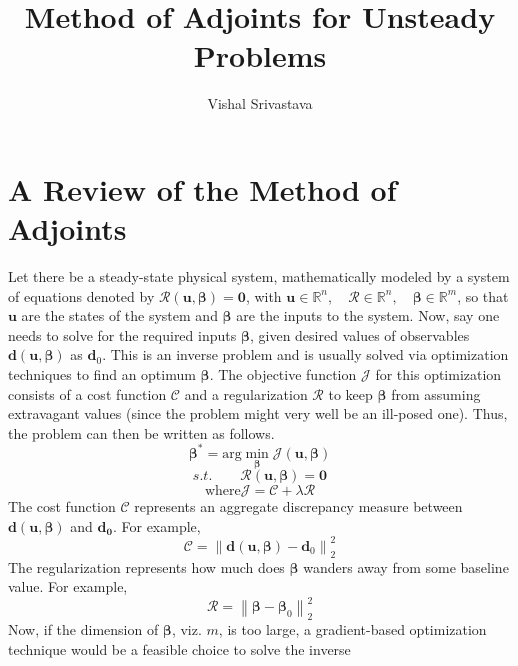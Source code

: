 \documentclass{article}
\title{Method of Adjoints for Unsteady Problems}
\author{Vishal Srivastava}
\date{}
\begin{document}
\maketitle

%
\section{A Review of the Method of Adjoints}
    Let there be a steady-state physical system, mathematically modeled by a system of equations denoted by $\boldsymbol{\mathcal{R}}(\boldsymbol{u}, 
    \boldsymbol{\beta})=\boldsymbol{0}$, with $\boldsymbol{u}\in\mathbb{R}^n,\quad \boldsymbol{\mathcal{R}}\in\mathbb{R}^n,\quad \boldsymbol{\beta}\in\mathbb{R}^m$, 
    so that $\boldsymbol{u}$ are the states of the system and $\boldsymbol{\beta}$ are the inputs to the system. Now, say one needs to solve for the required inputs
    $\boldsymbol{\beta}$, given desired values of observables $\boldsymbol{d}(\boldsymbol{u},\boldsymbol{\beta})$ as $\boldsymbol{d}_0$. This is an inverse problem 
    and is usually solved via optimization techniques to find an optimum $\boldsymbol{\beta}$. The objective function $\mathscr{J}$ for this optimization consists 
    of a cost function $\mathscr{C}$ and a regularization $\mathscr{R}$ to keep $\boldsymbol{\beta}$ from assuming extravagant values (since the problem might very 
    well be an ill-posed one). Thus, the problem can then be written as follows.
    $$
    \boldsymbol{\beta}^* = \text{arg} \min_{\boldsymbol{\beta}} \mathscr{J}(\boldsymbol{u}, \boldsymbol{\beta})
    $$
    $$
    s.t.\qquad \mathcal{R}(\boldsymbol{u}, \boldsymbol{\beta}) = \boldsymbol{0}
    $$
    $$
    \text{where} \mathscr{J} = \mathscr{C} + \lambda\mathscr{R}
    $$
    The cost function $\mathscr{C}$ represents an aggregate discrepancy measure between $\boldsymbol{d}(\boldsymbol{u}, \boldsymbol{\beta})$ and $\boldsymbol{d_0}$.
    For example,
    $$
    \mathscr{C} = \left\lVert\boldsymbol{d}(\boldsymbol{u}, \boldsymbol{\beta}) - \boldsymbol{d}_0\right\rVert_2^2
    $$
    The regularization represents how much does $\boldsymbol{\beta}$ wanders away from some baseline value. For example,
    $$
    \mathscr{R} = \left\lVert\boldsymbol{\beta} - \boldsymbol{\beta}_0\right\rVert_2^2
    $$
    Now, if the dimension of $\boldsymbol{\beta}$, viz. $m$, is too large, a gradient-based optimization technique would be a feasible choice to solve the inverse
\end{document}
